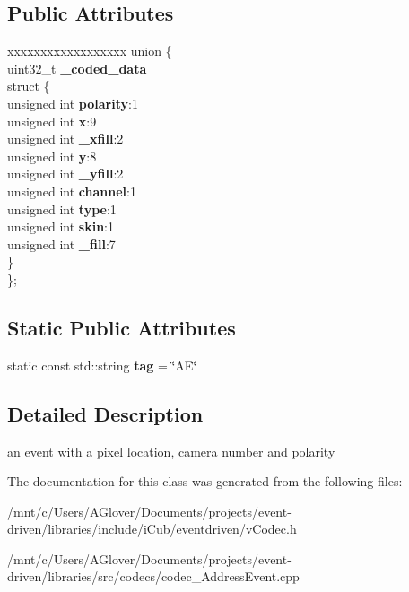 \subsection*{Public Attributes}
\begin{DoxyCompactItemize}
\item 
\mbox{\label{classev_1_1AddressEvent_a359b9c530269e582a058112a34a48383}} 
\begin{tabbing}
xx\=xx\=xx\=xx\=xx\=xx\=xx\=xx\=xx\=\kill
union \{\\
\>uint32\_t {\bfseries \_coded\_data}\\
\mbox{\label{unionev_1_1AddressEvent_1_1_0D1_a51f7d79230871a81eca60e6fe852b2df}} 
\>struct \{\\
\>\>unsigned int {\bfseries polarity}:1\\
\>\>unsigned int {\bfseries x}:9\\
\>\>unsigned int {\bfseries \_xfill}:2\\
\>\>unsigned int {\bfseries y}:8\\
\>\>unsigned int {\bfseries \_yfill}:2\\
\>\>unsigned int {\bfseries channel}:1\\
\>\>unsigned int {\bfseries type}:1\\
\>\>unsigned int {\bfseries skin}:1\\
\>\>unsigned int {\bfseries \_fill}:7\\
\>\} \\
\}; \\

\end{tabbing}\end{DoxyCompactItemize}
\subsection*{Static Public Attributes}
\begin{DoxyCompactItemize}
\item 
\mbox{\label{classev_1_1AddressEvent_a9a2d3e863964a1247ae4203a4ad2c646}} 
static const std\+::string {\bfseries tag} = \char`\"{}AE\char`\"{}
\end{DoxyCompactItemize}


\subsection{Detailed Description}
an event with a pixel location, camera number and polarity 

The documentation for this class was generated from the following files\+:\begin{DoxyCompactItemize}
\item 
/mnt/c/\+Users/\+A\+Glover/\+Documents/projects/event-\/driven/libraries/include/i\+Cub/eventdriven/v\+Codec.\+h\item 
/mnt/c/\+Users/\+A\+Glover/\+Documents/projects/event-\/driven/libraries/src/codecs/codec\+\_\+\+Address\+Event.\+cpp\end{DoxyCompactItemize}
